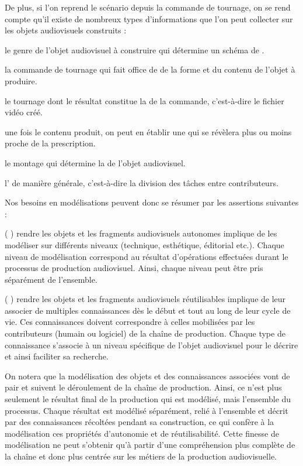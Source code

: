 De plus, si l'on reprend le scénario depuis la commande de tournage, on se rend compte qu'il existe de nombreux types d'informations que l'on peut collecter sur les objets audiovisuels construits :
\begin{liste}
	\item le genre de l'objet audiovisuel à construire qui détermine un schéma de . 
	\item la commande de tournage qui fait office de  de la forme et du contenu de l'objet à produire.
	\item le tournage dont le résultat constitue la  de la commande, c'est-à-dire le fichier vidéo créé.
	\item une fois le contenu produit, on peut en établir une  qui se révèlera plus ou moins proche de la prescription.
	\item le montage qui détermine la  de l'objet audiovisuel.
	\item l' de manière générale, c'est-à-dire la division des tâches entre contributeurs. 
\end{liste}

Nos besoins en modélisations peuvent donc se résumer par les assertions suivantes : 
\begin{liste}
	\item[(\e{B1}]) rendre les objets et les fragments audiovisuels autonomes implique de les modéliser sur différents niveaux (technique, esthétique, éditorial etc.). 
	Chaque niveau de modélisation correspond au résultat d'opérations effectuées durant le processus de production audiovisuel.
	Ainsi, chaque niveau peut être pris séparément de l'ensemble.

	\item[(\e{B2}]) rendre les objets et les fragments audiovisuels réutilisables implique de leur associer de multiples connaissances dès le début et tout au long de leur cycle de vie.
	Ces connaissances doivent correspondre à celles mobilisées par les contributeurs (humain ou logiciel) de la chaîne de production.
	Chaque type de connaissance s'associe à un niveau spécifique de l'objet audiovisuel pour le décrire et ainsi faciliter sa recherche.
\end{liste}

On notera que la modélisation des objets et des connaissances associées vont de pair et suivent le déroulement de la chaîne de production.
Ainsi, ce n'est plus seulement le résultat final de la production qui est modélisé, mais l'ensemble du processus.
Chaque résultat est modélisé séparément, relié à l'ensemble et décrit par des connaissances récoltées pendant sa construction, ce qui confère à la modélisation ces propriétés d'autonomie et de réutilisabilité.
Cette finesse de modélisation ne peut s'obtenir qu'à partir d'une compréhension plus complète de la chaîne et donc plus centrée sur les métiers de la production audiovisuelle. 
